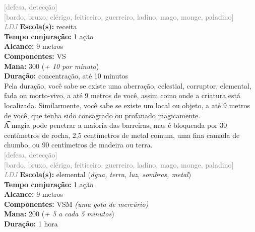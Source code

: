 \documentclass{RPG_Adventure}[2021/10/20]
\begin{document}
{\scriptsize \textcolor{gray}{[defesa, detecção]\\}}
{\scriptsize \textcolor{gray}{[bardo, bruxo, clérigo, feiticeiro, guerreiro, ladino, mago, monge, paladino]\\}}
{\tiny \textcolor{gray}{\textit{LDJ}}}
{\small \t \textbf{Escola(s):} receita\\\t \textbf{Tempo conjuração:} 1 ação\\\t \textbf{Alcance:} 9 metros\\\t \textbf{Componentes:} VS\\\t \textbf{Mana:} 300 (\textit{+ 10 por minuto})\\\t \textbf{Duração:} concentração, até 10 minutos\\}
{\normalsize Pela duração, você sabe se existe uma aberração, celestial, corruptor, elemental, fada ou morto-vivo, a até 9 metros de você, assim como onde a criatura está localizada. Similarmente, você sabe se existe um local ou objeto, a até 9 metros de você, que tenha sido consagrado ou profanado magicamente.\\\t A magia pode penetrar a maioria das barreiras, mas é bloqueada por 30 centímetros de rocha, 2,5 centímetros de metal comum, uma fina camada de chumbo, ou 90 centímetros de madeira ou terra.\\}
{\scriptsize \textcolor{gray}{[defesa, detecção]\\}}
{\scriptsize \textcolor{gray}{[bardo, bruxo, clérigo, feiticeiro, guerreiro, ladino, mago, monge, paladino]\\}}
{\tiny \textcolor{gray}{\textit{LDJ}}}
{\small \t \textbf{Escola(s):} elemental (\textit{água, terra, luz, sombras, metal})\\\t \textbf{Tempo conjuração:} 1 ação\\\t \textbf{Alcance:} 9 metros\\\t \textbf{Componentes:} VSM \textit{(uma gota de mercúrio)}\\\t \textbf{Mana:} 200 (\textit{+ 5 a cada 5 minutos})\\\t \textbf{Duração:} 1 hora\\}
\end{document}

